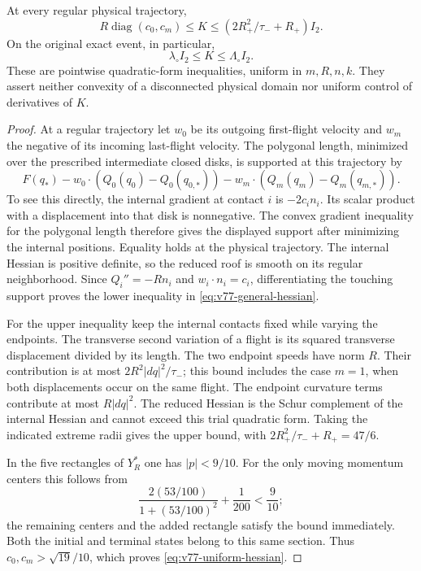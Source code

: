 \begin{lemma}
\label{lem:v77-hessian}
At every regular physical trajectory,
\begin{equation}\label{eq:v77-general-hessian}
 R\operatorname{diag}(c_0,c_m)\le K
       \le (2R_+^2/\tau_-+R_+)I_2.
\end{equation}
On the original exact event, in particular,
\begin{equation}\label{eq:v77-uniform-hessian}
                  \lambda_\circ I_2\le K\le\Lambda_\circ I_2.
\end{equation}
These are pointwise quadratic-form inequalities, uniform in $m,R,n,k$.
They assert neither convexity of a disconnected physical domain nor
uniform control of derivatives of $K$.
\end{lemma}
\begin{proof}
At a regular trajectory let $w_0$ be its outgoing first-flight
velocity and $w_m$ the negative of its incoming last-flight velocity.
The polygonal length, minimized over the prescribed intermediate
closed disks, is supported at this trajectory by
\[
 F(q_*)-w_0\cdot(Q_0(q_0)-Q_0(q_{0,*}))
        -w_m\cdot(Q_m(q_m)-Q_m(q_{m,*})).
\]
To see this directly, the internal gradient at contact $i$ is
$-2c_i n_i$. Its scalar product with a displacement into that disk
is nonnegative. The convex gradient inequality for the polygonal
length therefore gives the displayed support after minimizing the
internal positions. Equality holds at the physical trajectory.
The internal Hessian is positive definite, so the reduced roof is
smooth on its regular neighborhood. Since $Q_i''=-Rn_i$ and
$w_i\cdot n_i=c_i$, differentiating the touching support proves the
lower inequality in \eqref{eq:v77-general-hessian}.

For the upper inequality keep the internal contacts fixed while
varying the endpoints. The transverse second variation of a flight
is its squared transverse displacement divided by its length.
The two endpoint speeds have norm $R$. Their contribution is at
most $2R^2|dq|^2/\tau_-$; this bound includes the case $m=1$,
when both displacements occur on the same flight. The endpoint
curvature terms contribute at most $R|dq|^2$. The reduced Hessian
is the Schur complement of the internal Hessian and cannot exceed
this trial quadratic form. Taking the indicated extreme radii gives
the upper bound, with $2R_+^2/\tau_-+R_+=47/6$.

In the five rectangles of $Y_R^*$ one has $|p|<9/10$. For the only
moving momentum centers this follows from
\[
 \frac{2(53/100)}{1+(53/100)^2}+\frac1{200}<\frac9{10};
\]
the remaining centers and the added rectangle satisfy the bound
immediately. Both the initial and terminal states belong to this
same section. Thus $c_0,c_m>\sqrt{19}/10$, which proves
\eqref{eq:v77-uniform-hessian}.
\end{proof}

